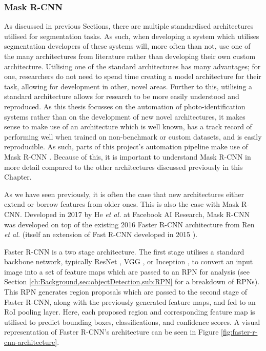 \subsubsection{Mask R-CNN}\label{ch:Background,sec:instanceSegmentation,sub:Mask R-CNN}

As discussed in previous Sections, there are multiple standardised architectures utilised for segmentation tasks. As such, when developing a system which utilises segmentation developers of these systems will, more often than not, use one of the many architectures from literature rather than developing their own custom architecture. Utilising one of the standard architectures has many advantages; for one, researchers do not need to spend time creating a model architecture for their task, allowing for development in other, novel areas. Further to this, utilising a standard architecture allows for research to be more easily understood and reproduced. As this thesis focusses on the automation of photo-identification systems rather than on the development of new novel architectures, it makes sense to make use of an architecture which is well known, has a track record of performing well when trained on non-benchmark or custom datasets, and is easily reproducible. As such, parts of this project's automation pipeline make use of Mask R-CNN \cite{he_mask_2017}. Because of this, it is important to understand Mask R-CNN in more detail compared to the other architectures discussed previously in this Chapter. 

As we have seen previously, it is often the case that new architectures either extend or borrow features from older ones. This is also the case with Mask R-CNN. Developed in 2017 by He \textit{et al.} at Facebook AI Research, Mask R-CNN was developed on top of the existing 2016 Faster R-CNN architecture from Ren \textit{et al.} \cite{ren_faster_2015} (itself an extension of Fast R-CNN developed in 2015 \cite{girshick_fast_2015}). 

Faster R-CNN is a two stage architecture. The first stage utilises a standard backbone network, typically ResNet \cite{he_deep_2015}, VGG \cite{simonyan_very_2015}, or Inception \cite{szegedy_going_2015}, to convert an input image into a set of feature maps which are passed to an RPN for analysis (see Section \ref{ch:Background,sec:objectDetection,sub:RPN} for a breakdown of RPNs). This RPN generates region proposals which are passed to the second stage of Faster R-CNN, along with the previously generated feature maps, and fed to an RoI pooling layer.  Here, each proposed region and corresponding feature map is utilised to predict bounding boxes, classifications, and confidence scores. A visual representation of Faster R-CNN's architecture can be seen in Figure \ref{fig:faster-r-cnn-architecture}.


